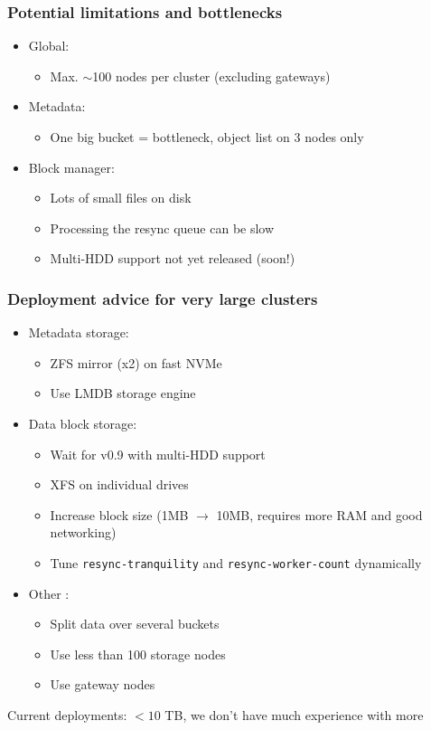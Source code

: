 \documentclass[aspectratio=169]{beamer}
\begin{document}
\begin{frame}
	\frametitle{Potential limitations and bottlenecks}
	\begin{itemize}
		\item Global:
			\begin{itemize}
				\item Max. $\sim$100 nodes per cluster (excluding gateways)
			\end{itemize}
			\vspace{1em}
		\item Metadata:
			\begin{itemize}
				\item One big bucket = bottleneck, object list on 3 nodes only
			\end{itemize}
			\vspace{1em}
		\item Block manager:
			\begin{itemize}
				\item Lots of small files on disk
				\item Processing the resync queue can be slow
				\item Multi-HDD support not yet released (soon!)
			\end{itemize}
	\end{itemize}
\end{frame}

\begin{frame}
	\frametitle{Deployment advice for very large clusters}
	\begin{itemize}
		\item Metadata storage:
			\begin{itemize}
				\item ZFS mirror (x2) on fast NVMe
				\item Use LMDB storage engine
			\end{itemize}
			\vspace{.5em}
		\item Data block storage:
			\begin{itemize}
				\item Wait for v0.9 with multi-HDD support
				\item XFS on individual drives
				\item Increase block size (1MB $\to$ 10MB, requires more RAM and good networking)
				\item Tune \texttt{resync-tranquility} and \texttt{resync-worker-count} dynamically
			\end{itemize}
			\vspace{.5em}
		\item Other :
			\begin{itemize}
				\item Split data over several buckets
				\item Use less than 100 storage nodes
				\item Use gateway nodes
			\end{itemize}
			\vspace{.5em}
	\end{itemize}
	Current deployments: $< 10$ TB, we don't have much experience with more
\end{frame}
\end{document}
